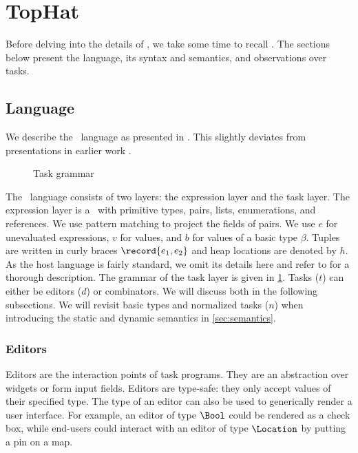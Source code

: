 
\section{TopHat}
\label{sec:tophat}

Before delving into the details of \DYNTOPHAT, we take some time to recall \TOPHAT.
The sections below present the language, its syntax and semantics, and observations over tasks.

\subsection{Language}

We describe the \TOPHAT\ language as presented in \citet{Steenvoorden22}.
This slightly deviates from presentations in earlier work \cite{conf/ppdp/SteenvoordenNK19,conf/ifl/NausSK19,conf/sfp/NausS20}.

\begin{figure}[b]
  \caption{Task grammar}
  \label{fig:task-grammar}
\end{figure}

The \TOPHAT\ language consists of two layers: the expression layer and the task layer.
The expression layer is a \STLC\ with primitive types, pairs, lists, enumerations, and references.
We use pattern matching to project the fields of pairs.
We use $e$ for unevaluated expressions, $v$ for values, and $b$ for values of a basic type $\beta$.
Tuples are written in curly braces $\record{e_1, e_2}$ and heap locations are denoted by $h$.
As the host language is fairly standard, we omit its details here
and refer to \citet{Steenvoorden22} for a thorough description.
The grammar of the task layer is given in \cref{fig:task-grammar}.
Tasks ($t$) can either be editors ($d$) or combinators.
We will discuss both in the following subsections.
We will revisit basic types and normalized tasks ($n$) when introducing the static and dynamic semantics in \cref{sec:semantics}.

\subsubsection{Editors}

Editors are the interaction points of task programs.
They are an abstraction over widgets or form input fields.
Editors are type-safe:
they only accept values of their specified type.
The type of an editor can also be used to generically render a user interface.
For example,
an editor of type $\Bool$ could be rendered as a check box,
while end-users could interact with an editor of type $\Location$ by putting a pin on a map.

